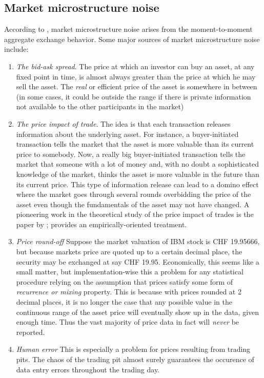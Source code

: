 \subsection{Market microstructure noise}  
According to \cite{Garman1976}, market microstructure noise arises from the moment-to-moment aggregate exchange behavior. Some major sources of market microstructure noise include:
    \begin{enumerate}
      \item \emph{The bid-ask spread}. The price at which an investor can buy an asset, at any fixed point in time,   is almost always greater than the price at which he may sell the asset. The \emph{real} or efficient price of the asset is somewhere in between (in some cases, it could be outside the range if there is private information not available to the other participants in the market)
      \item \emph{The price impact of trade}. The idea is that each transaction releases information about the underlying asset. For instance, a buyer-initiated transaction tells the market that the asset is more valuable than its current price to somebody. Now, a really big buyer-initiated transaction tells the market that someone with a lot of money and, with no doubt a sophisticated knowledge of the market, thinks the asset is more valuable in the future than its current price. This type of information release can lead to a domino effect where the market goes through several rounds overbidding the price of the asset even though the fundamentals of the asset may not have changed. A pioneering work in the theoretical study of the price impact of trades is the paper by \cite{Roll1984};  \cite{Hasbrouck1991} provides an empirically-oriented treatment.
      \item \emph{Price round-off} Suppose the market valuation of IBM stock is CHF 19.95666, but because markets price are quoted up to a certain decimal place, the security may be exchanged  at say CHF 19.95. Economically, this seems like a small matter, but implementation-wise  this  a problem for any statistical procedure relying on the assumption that prices satisfy some form of \emph{recurrence or mixing} property. This is because with prices rounded at 2 decimal places, it is no longer the case that any possible value in the continuous range of the asset price will eventually show up in the data, given enough time. Thus the vast majority of price data in fact will \emph{never} be reported.
      \item\emph{Human error} This is especially a problem for prices resulting from trading pits. The chaos of the trading pit almost surely guarantees the occurence of data entry errors throughout the trading day.
\end{enumerate}
